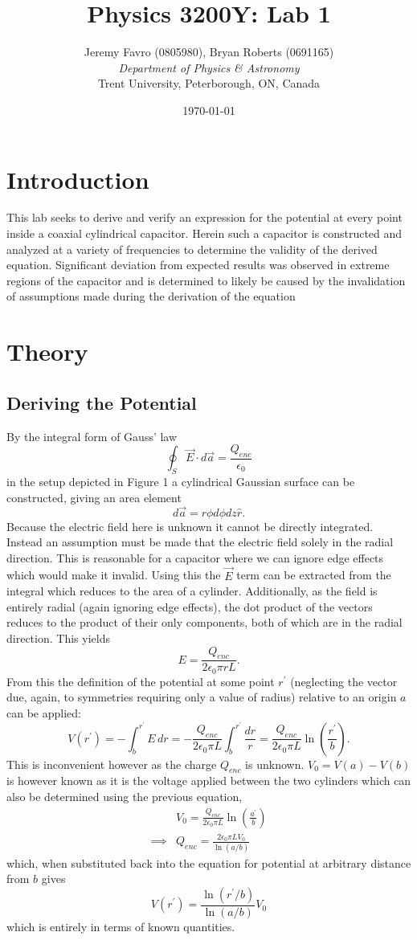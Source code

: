 \documentclass[10pt, twocolumn]{article}
\title{Physics 3200Y: Lab 1}
\author{Jeremy Favro (0805980), Bryan Roberts (0691165) 
 \\\emph{Department of Physics \& Astronomy}\\ Trent University, Peterborough, ON, Canada}
\date{\today}
\theoremstyle{definition}
\newcommand{\primed}[1]{#1^\prime}
\begin{document}
\maketitle

\section{Introduction}
This lab seeks to derive and verify an expression for the potential at every point inside a coaxial cylindrical capacitor.
Herein such a capacitor is constructed and analyzed at a variety of frequencies to determine the validity of the derived equation.
Significant deviation from expected results was observed in extreme regions of the capacitor and is determined to likely be caused
by the invalidation of assumptions made during the derivation of the equation
\section{Theory}
\subsection{Deriving the Potential}
By the integral form of Gauss'
law
$$\oint_{S}\vec{E}\cdot d\vec{a}=\frac{Q_{enc}}{\epsilon_0}$$
in the setup depicted in Figure 1 a cylindrical Gaussian surface can be constructed, giving an area element
$$d\vec{a}=r\phi d\phi dz\hat{r}.$$
Because the electric field here is unknown it cannot be directly integrated.
Instead an assumption must be made that the electric field solely in the radial direction.
This is reasonable for a capacitor where we can ignore edge effects which would make it invalid.
Using this the $\vec{E}$ term can be extracted from the integral which reduces
to the area of a cylinder. Additionally, as the field is entirely radial
(again ignoring edge effects), the dot product of the vectors reduces
to the product of their only components, both of which are in the radial direction. This yields
$$E=\frac{Q_{enc}}{2\epsilon_0\pi r L}.$$
From this the definition of the potential at some point $\primed{r}$ (neglecting the
vector due, again, to symmetries requiring only a value of radius) relative to an origin $a$ can be applied:
$$V(\primed{r})
  =-\int_{b}^{\primed{r}}E\,dr
  =-\frac{Q_{enc}}{2\epsilon_0\pi L}\int_{b}^{\primed{r}}\frac{dr}{r}
  =\frac{Q_{enc}}{2\epsilon_0\pi L}\ln\left(\frac{\primed{r}}{b}\right).$$
This is inconvenient however as the charge $Q_{enc}$ is unknown.
$V_0=V(a)-V(b)$ is however known as it is the voltage applied between the two cylinders
which can also be determined using the previous equation,
\begin{align*}
           & V_0     =\frac{Q_{enc}}{2\epsilon_0\pi L}\ln\left(\frac{\primed{a}}{b}\right) \\
  \implies & Q_{enc} =\frac{2\epsilon_0\pi L V_0}{\ln\left(a/b\right)}
\end{align*}
which, when substituted back into the equation for potential at arbitrary distance from $b$ gives
$$V(\primed{r})=
  \frac{\ln\left(\primed{r}/b\right)}{\ln\left(a/b\right)}V_0$$
which is entirely in terms of known quantities.
\clearpage
\end{document}
